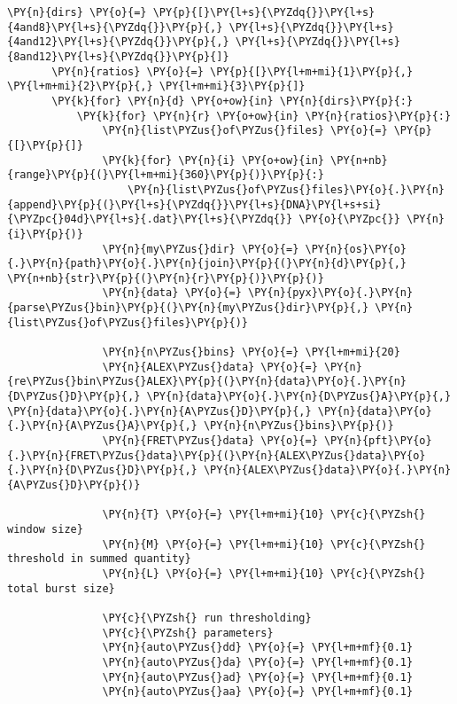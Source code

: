 \begin{Verbatim}[commandchars=\\\{\}, fontsize=\scriptsize]
       \PY{n}{dirs} \PY{o}{=} \PY{p}{[}\PY{l+s}{\PYZdq{}}\PY{l+s}{4and8}\PY{l+s}{\PYZdq{}}\PY{p}{,} \PY{l+s}{\PYZdq{}}\PY{l+s}{4and12}\PY{l+s}{\PYZdq{}}\PY{p}{,} \PY{l+s}{\PYZdq{}}\PY{l+s}{8and12}\PY{l+s}{\PYZdq{}}\PY{p}{]}
       \PY{n}{ratios} \PY{o}{=} \PY{p}{[}\PY{l+m+mi}{1}\PY{p}{,} \PY{l+m+mi}{2}\PY{p}{,} \PY{l+m+mi}{3}\PY{p}{]}
       \PY{k}{for} \PY{n}{d} \PY{o+ow}{in} \PY{n}{dirs}\PY{p}{:}
           \PY{k}{for} \PY{n}{r} \PY{o+ow}{in} \PY{n}{ratios}\PY{p}{:}      
               \PY{n}{list\PYZus{}of\PYZus{}files} \PY{o}{=} \PY{p}{[}\PY{p}{]}
               \PY{k}{for} \PY{n}{i} \PY{o+ow}{in} \PY{n+nb}{range}\PY{p}{(}\PY{l+m+mi}{360}\PY{p}{)}\PY{p}{:}
                   \PY{n}{list\PYZus{}of\PYZus{}files}\PY{o}{.}\PY{n}{append}\PY{p}{(}\PY{l+s}{\PYZdq{}}\PY{l+s}{DNA}\PY{l+s+si}{\PYZpc{}04d}\PY{l+s}{.dat}\PY{l+s}{\PYZdq{}} \PY{o}{\PYZpc{}} \PY{n}{i}\PY{p}{)}
               \PY{n}{my\PYZus{}dir} \PY{o}{=} \PY{n}{os}\PY{o}{.}\PY{n}{path}\PY{o}{.}\PY{n}{join}\PY{p}{(}\PY{n}{d}\PY{p}{,} \PY{n+nb}{str}\PY{p}{(}\PY{n}{r}\PY{p}{)}\PY{p}{)}
               \PY{n}{data} \PY{o}{=} \PY{n}{pyx}\PY{o}{.}\PY{n}{parse\PYZus{}bin}\PY{p}{(}\PY{n}{my\PYZus{}dir}\PY{p}{,} \PY{n}{list\PYZus{}of\PYZus{}files}\PY{p}{)}
       
               \PY{n}{n\PYZus{}bins} \PY{o}{=} \PY{l+m+mi}{20}
               \PY{n}{ALEX\PYZus{}data} \PY{o}{=} \PY{n}{re\PYZus{}bin\PYZus{}ALEX}\PY{p}{(}\PY{n}{data}\PY{o}{.}\PY{n}{D\PYZus{}D}\PY{p}{,} \PY{n}{data}\PY{o}{.}\PY{n}{D\PYZus{}A}\PY{p}{,} \PY{n}{data}\PY{o}{.}\PY{n}{A\PYZus{}D}\PY{p}{,} \PY{n}{data}\PY{o}{.}\PY{n}{A\PYZus{}A}\PY{p}{,} \PY{n}{n\PYZus{}bins}\PY{p}{)}
               \PY{n}{FRET\PYZus{}data} \PY{o}{=} \PY{n}{pft}\PY{o}{.}\PY{n}{FRET\PYZus{}data}\PY{p}{(}\PY{n}{ALEX\PYZus{}data}\PY{o}{.}\PY{n}{D\PYZus{}D}\PY{p}{,} \PY{n}{ALEX\PYZus{}data}\PY{o}{.}\PY{n}{A\PYZus{}D}\PY{p}{)}
               
               \PY{n}{T} \PY{o}{=} \PY{l+m+mi}{10} \PY{c}{\PYZsh{} window size}
               \PY{n}{M} \PY{o}{=} \PY{l+m+mi}{10} \PY{c}{\PYZsh{} threshold in summed quantity}
               \PY{n}{L} \PY{o}{=} \PY{l+m+mi}{10} \PY{c}{\PYZsh{} total burst size}
                   
               \PY{c}{\PYZsh{} run thresholding}
               \PY{c}{\PYZsh{} parameters}
               \PY{n}{auto\PYZus{}dd} \PY{o}{=} \PY{l+m+mf}{0.1}
               \PY{n}{auto\PYZus{}da} \PY{o}{=} \PY{l+m+mf}{0.1}
               \PY{n}{auto\PYZus{}ad} \PY{o}{=} \PY{l+m+mf}{0.1}
               \PY{n}{auto\PYZus{}aa} \PY{o}{=} \PY{l+m+mf}{0.1}
               

\end{Verbatim}
